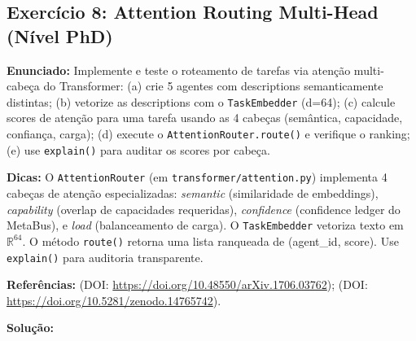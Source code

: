 \subsection{Exercício 8: Attention Routing Multi-Head (Nível PhD)}
\label{sec:ex8}

\textbf{Enunciado:} Implemente e teste o roteamento de tarefas via atenção multi-cabeça do Transformer: (a) crie 5 agentes com descriptions semanticamente distintas; (b) vetorize as descriptions com o \texttt{TaskEmbedder} (d=64); (c) calcule scores de atenção para uma tarefa usando as 4 cabeças (semântica, capacidade, confiança, carga); (d) execute o \texttt{AttentionRouter.route()} e verifique o ranking; (e) use \texttt{explain()} para auditar os scores por cabeça.

\textbf{Dicas:} O \texttt{AttentionRouter} (em \texttt{transformer/attention.py}) implementa 4 cabeças de atenção especializadas: \textit{semantic} (similaridade de embeddings), \textit{capability} (overlap de capacidades requeridas), \textit{confidence} (confidence ledger do MetaBus), e \textit{load} (balanceamento de carga). O \texttt{TaskEmbedder} vetoriza texto em $\mathbb{R}^{64}$. O método \texttt{route()} retorna uma lista ranqueada de (agent\_id, score). Use \texttt{explain()} para auditoria transparente.

\textbf{Referências:} \citet{vaswani2017attention} (DOI: \url{https://doi.org/10.48550/arXiv.1706.03762}); \citet{claro2025spec004} (DOI: \url{https://doi.org/10.5281/zenodo.14765742}).

\textbf{Solução:}

